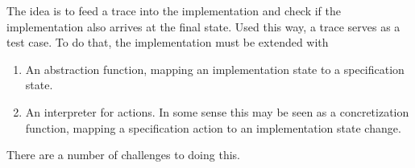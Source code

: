 \documentclass[a4paper]{article}
\begin{document}
The idea is to feed a trace into the implementation and check if the implementation also arrives at the final state. Used this way, a trace serves as a test case.
%
To do that, the implementation must be extended with

\begin{enumerate}
    \item An abstraction function, mapping an implementation state to a specification state.

    \item An interpreter for actions. In some sense this may be seen as a concretization function, mapping a specification action to an implementation state change.
\end{enumerate}

There are a number of challenges to doing this.
\end{document}
